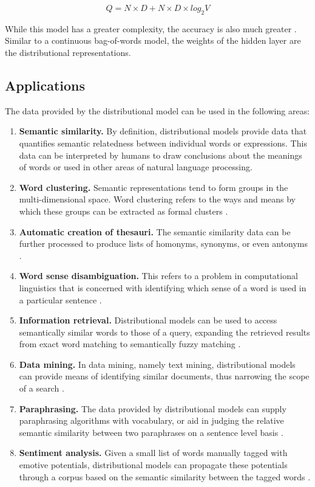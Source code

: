 \documentclass[14pt, a4paper]{extreport}
\begin{document}
\[Q = N \times D + N \times D \times log_2{V} \]

While this model has a greater complexity, the accuracy is also much greater \parencite{mikolov}. Similar to a continuous bag-of-words model, the weights of the hidden layer are the distributional representations.
    \subsection{Applications}
The data provided by the distributional model can be used in the following areas:

\begin{enumerate}
  \item \textbf{Semantic similarity.} By definition, distributional models provide data that quantifies semantic relatedness between individual words or expressions. This data can be interpreted by humans to draw conclusions about the meanings of words or used in other areas of natural language processing.
  \item \textbf{Word clustering.} Semantic representations tend to form groups in the multi-dimensional space. Word clustering refers to the ways and means by which these groups can be extracted as formal clusters \parencite{bekkerman}.
  \item \textbf{Automatic creation of thesauri.} The semantic similarity data can be further processed to produce lists of homonyms, synonyms, or even antonyms \parencite{henestroza}.
  \item \textbf{Word sense disambiguation.} This refers to a problem in computational linguistics that is concerned with identifying which sense of a word is used in a particular sentence \parencite{musto}.
  \item \textbf{Information retrieval.} Distributional models can be used to access semantically similar words to those of a query, expanding the retrieved results from exact word matching to semantically fuzzy matching \parencite{silva}.
  \item \textbf{Data mining.} In data mining, namely text mining, distributional models can provide means of identifying similar documents, thus narrowing the scope of a search \parencite[89]{dalianis}.
  \item \textbf{Paraphrasing.} The data provided by distributional models can supply paraphrasing algorithms with vocabulary, or aid in judging the relative semantic similarity between two paraphrases on a sentence level basis \parencite{desouki}.
  \item \textbf{Sentiment analysis.} Given a small list of words manually tagged with emotive potentials, distributional models can propagate these potentials through a corpus based on the semantic similarity between the tagged words \parencite{alshari}.
\end{enumerate}
\end{document}

